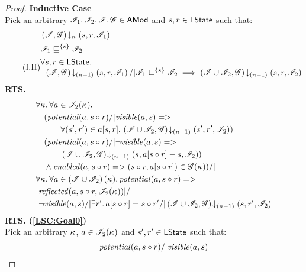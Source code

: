 \begin{lemma}
\begin{proof}
\noindent\textbf{Inductive Case}\\
Pick an arbitrary $\mathscr{I}_1, \mathscr{I}_2, \mathscr{I}, \mathscr{G} \in \textsf{AMod}$ and $s, r \in \textsf{LState}$ such that:
\begin{align}
	&\extendsAMUpto{\lmod, \gmod}{n}{s}{r}{\lmod_1} \label{LSC:Ass1}\\
	&\lmod_1 \weakenI{\{s\}} \lmod_2 \label{LSC:Ass2}\\
	\tag{I.H}	
	&\begin{array}{@{} l @{\hspace{-2cm}} l @{}}
		\for{s, r \in \LStates} &\\
		&\extendsAMUpto{\lmod, \gmod}{(n-1)}{s}{r}{\lmod_1} /| \lmod_1 \weakenI{\{s\}} \lmod_2 \implies \extendsAMUpto{\lmod \cup \lmod_2, \gmod}{(n-1)}{s}{r}{\lmod_2}
	\end{array} \label{LSC:IH}
\end{align}
%
\textbf{RTS. } 
%
\begin{align}
	& 
	\V{\ca{}}  \V{a\in \lmod_2(\ca{})} \nonumber \\
  &\quad (\m{potential}(a,s \composeL r) /| \m{visible}(a, s) => \nonumber\\
  & \quad\qquad\for{(s', r') \in a[s, r]} \extendsAMUpto{\lmod \cup \lmod_2, \gmod}{(n-1)}{s'}{r'}{\lmod_2}) \label{LSC:Goal0}\\
% 
	&\quad (\m{potential}(a,s \composeL r) /| \neg\m{visible}(a, s) => \nonumber\\
  & \quad\qquad \extendsAMUpto{\lmod \cup \lmod_2, \gmod}{(n-1)}{s}{a[s \composeL r] - s}{\lmod_2}) \label{LSC:Goal1}\\
%   
  &\quad\land \m{enabled}(a,s \composeL r)
  => (s\composeL r, a[s \composeL r])\in \gmod(\ca{}))
  /|\null \label{LSC:Goal2}\\
%  
  &\V{\ca{}}\V{a\in \left(\lmod \cup \lmod_2 \right) (\ca{})}
  \m{potential}(a,s \composeL r) =>\null \nonumber \\
  &\ \m{reflected}(a,s \composeL r,\lmod_2(\ca{})) |/\null \nonumber \\
%  
  &\ \neg\m{visible}(a,s) /| \exsts{r'} a[s \composeL r] = s \composeL r' /| \extendsAMUpto{\lmod \cup \lmod_2, \gmod}{(n-1)}{s}{r'}{\lmod_2}  \label{LSC:Goal3}
\end{align}
%
\noindent\textbf{RTS. (\ref{LSC:Goal0})} \\
Pick an arbitrary $\kappa_{}$, $a \in \mathscr{I}_2(\kappa_{})$ and $s', r' \in \textsf{LState}$ such that:
\begin{align}
	\m{potential}(a, s \composeL r) /| \m{visible}(a, s) \label{LSC:Ass3}\\

\end{align}
\end{proof}
\end{lemma}
